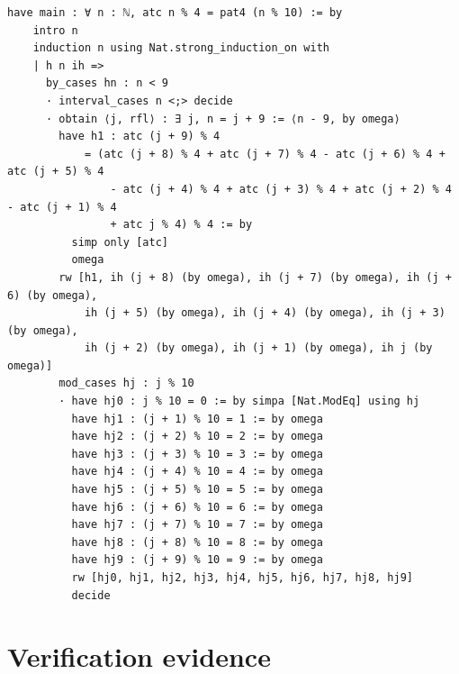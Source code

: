 \documentclass[11pt]{article}
\theoremstyle{definition}
\begin{document}
\begin{lstlisting}[caption={Theorem~\ref{thm:t3}: the same skeleton at period
$10$ --- the mod-4 collapse and the first residue branch, verbatim excerpt of
the final artifact (lines 283--311, sha256 \texttt{f1aa7099}; line endings
normalized from CRLF).},label={lst:t3step}]
  have main : ∀ n : ℕ, atc n % 4 = pat4 (n % 10) := by
    intro n
    induction n using Nat.strong_induction_on with
    | h n ih =>
      by_cases hn : n < 9
      · interval_cases n <;> decide
      · obtain ⟨j, rfl⟩ : ∃ j, n = j + 9 := ⟨n - 9, by omega⟩
        have h1 : atc (j + 9) % 4
            = (atc (j + 8) % 4 + atc (j + 7) % 4 - atc (j + 6) % 4 + atc (j + 5) % 4
                - atc (j + 4) % 4 + atc (j + 3) % 4 + atc (j + 2) % 4 - atc (j + 1) % 4
                + atc j % 4) % 4 := by
          simp only [atc]
          omega
        rw [h1, ih (j + 8) (by omega), ih (j + 7) (by omega), ih (j + 6) (by omega),
            ih (j + 5) (by omega), ih (j + 4) (by omega), ih (j + 3) (by omega),
            ih (j + 2) (by omega), ih (j + 1) (by omega), ih j (by omega)]
        mod_cases hj : j % 10
        · have hj0 : j % 10 = 0 := by simpa [Nat.ModEq] using hj
          have hj1 : (j + 1) % 10 = 1 := by omega
          have hj2 : (j + 2) % 10 = 2 := by omega
          have hj3 : (j + 3) % 10 = 3 := by omega
          have hj4 : (j + 4) % 10 = 4 := by omega
          have hj5 : (j + 5) % 10 = 5 := by omega
          have hj6 : (j + 6) % 10 = 6 := by omega
          have hj7 : (j + 7) % 10 = 7 := by omega
          have hj8 : (j + 8) % 10 = 8 := by omega
          have hj9 : (j + 9) % 10 = 9 := by omega
          rw [hj0, hj1, hj2, hj3, hj4, hj5, hj6, hj7, hj8, hj9]
          decide
\end{lstlisting}

\section{Verification evidence}
\end{document}
